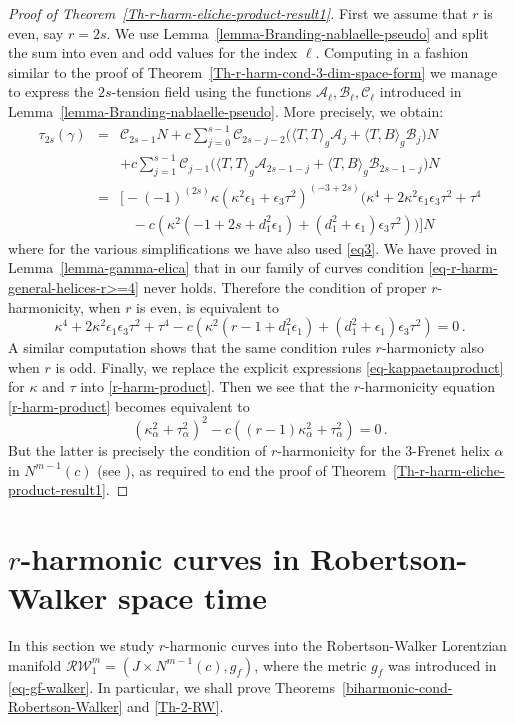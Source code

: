\documentclass[11pt]{amsart}
\theoremstyle{plain}
\theoremstyle{definition}
\numberwithin{equation}{section}
\begin{document}
\begin{proof}[Proof of Theorem~\ref{Th-r-harm-eliche-product-result1}]
First we assume that $r$ is even, say $r=2s$. We use Lemma~\ref{lemma-Branding-nablaelle-pseudo} and split the sum into even and odd values for the index $\ell$. Computing in a fashion similar to the proof of Theorem~\ref{Th-r-harm-cond-3-dim-space-form} we manage to express the $2s$-tension field using the functions ${\mathcal A}_{\ell},{\mathcal B}_{\ell},{\mathcal C}_{\ell}$ introduced in Lemma~\ref{lemma-Branding-nablaelle-pseudo}. 
More precisely, we obtain:
\begin{eqnarray}
\tau_{2s}(\gamma)&=&{\mathcal C}_{2s-1} N+c \sum_{j=0}^{s-1}{\mathcal C}_{2s-j-2}\big ( \langle T, T\rangle_g {\mathcal A}_{j}+\langle T, B\rangle_g {\mathcal B}_{j}\big )N\\\nonumber
&&+c \sum_{j=1}^{s-1}{\mathcal C}_{j-1}\big ( \langle T, T\rangle_g {\mathcal A}_{2s-1-j}+\langle T, B\rangle_g {\mathcal B}_{2s-1-j} \big )N\\\nonumber
&=&\Big[-(-1)^{(2 s)} \kappa (\kappa^2 \epsilon_1+\epsilon_3 \tau^2)^{(-3+2 s)} \Big(\kappa^4+2 \kappa^2 \epsilon_1 \epsilon_3 \tau^2+\tau^4\\\nonumber
&&\,\,\,\,\,-c (\kappa^2 (-1+2 s+d_1^2 \epsilon_1)+(d_1^2+\epsilon_1) \epsilon_3 \tau^2)\Big) \Big ] N
\end{eqnarray}
where for the various simplifications we have also used \eqref{eq3}. We have proved in Lemma~\ref{lemma-gamma-elica} that in our family of curves condition \eqref{eq-r-harm-general-helices-r>=4} never holds. Therefore the condition of proper $r$-harmonicity, when $r$ is even, is equivalent to
\begin{equation}\label{r-harm-product}
\kappa^4+2 \kappa^2 \epsilon_1 \epsilon_3 \tau^2+\tau^4-c (\kappa^2 (r-1+d_1^2 \epsilon_1)+(d_1^2+\epsilon_1) \epsilon_3 \tau^2)=0\,.
\end{equation}
A similar computation shows that the same condition rules $r$-harmonicty also when $r$ is odd. Finally, we replace the explicit expressions \eqref{eq-kappaetauproduct} for $\kappa$ and $\tau$ into \eqref{r-harm-product}. Then we see that the $r$-harmonicity equation \eqref{r-harm-product} becomes equivalent to
\[
(\kappa_\alpha^2+\tau_\alpha^2)^2-c ((r-1)\kappa_\alpha^2 +\tau_\alpha^2)=0\,.
\]
But the latter is precisely the condition of $r$-harmonicity for the $3$-Frenet helix $\alpha$ in $N^{m-1}(c)$ (see \cite{MR4542687}), as required to end the proof of Theorem~\ref{Th-r-harm-eliche-product-result1}.
\end{proof}

\section{$r$-harmonic curves in Robertson-Walker space time}\label{Sec-Rob-Walker}
In this section we study $r$-harmonic curves into the Robertson-Walker Lorentzian manifold $\mathcal{RW}^{m}_1 =\left ( J \times N^{m-1}(c),g_f\right )$, where the metric $g_f$ was introduced in \eqref{eq-gf-walker}.
In particular, we shall prove Theorems~\ref{biharmonic-cond-Robertson-Walker} and \ref{Th-2-RW}.
\end{document}
